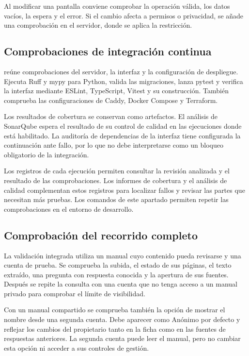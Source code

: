 Al modificar una pantalla conviene comprobar la operación válida, los datos vacíos, la espera y el error. Si el cambio afecta a permisos o privacidad, se añade una comprobación en el servidor, donde se aplica la restricción.

\subsection{Comprobaciones de integración continua}

 reúne comprobaciones del servidor, la interfaz y la configuración de despliegue. Ejecuta Ruff y mypy para Python, valida las migraciones, lanza pytest y verifica la interfaz mediante ESLint, TypeScript, Vitest y su construcción. También comprueba las configuraciones de Caddy, Docker Compose y Terraform.

Los resultados de cobertura se conservan como artefactos. El análisis de SonarQube espera el resultado de su control de calidad en las ejecuciones donde está habilitado. La auditoría de dependencias de la interfaz tiene configurada la continuación ante fallo, por lo que no debe interpretarse como un bloqueo obligatorio de la integración.

Los registros de cada ejecución permiten consultar la revisión analizada y
el resultado de las comprobaciones. Los informes de cobertura y el análisis
de calidad complementan estos registros para localizar fallos y revisar
las partes que necesitan más pruebas. Los comandos de este apartado
permiten repetir las comprobaciones en el entorno de desarrollo.

\subsection{Comprobación del recorrido completo}

La validación integrada utiliza un manual cuyo contenido pueda revisarse y una cuenta de prueba. Se comprueba la subida, el estado de sus páginas, el texto extraído, una pregunta con respuesta conocida y la apertura de sus fuentes. Después se repite la consulta con una cuenta que no tenga acceso a un manual privado para comprobar el límite de visibilidad.

Con un manual compartido se comprueba también la opción de mostrar el
nombre desde una segunda cuenta. Debe aparecer como
\guillemotleft{}Anónimo\guillemotright{} por defecto y reflejar los cambios
del propietario tanto en la ficha como en las fuentes de respuestas
anteriores. La segunda cuenta puede leer el manual, pero no cambiar esta
opción ni acceder a sus controles de gestión.

